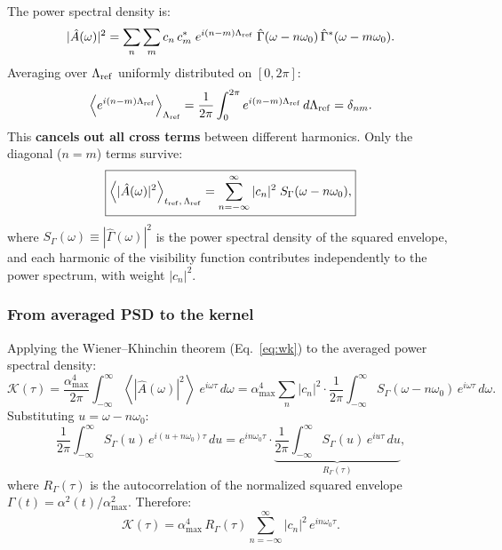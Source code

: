 \documentclass[preprint]{aastex702}
\newcommand{\FT}[1]{\hat{#1}}
\begin{document}
The power spectral density is:
\begin{equation}
    |\FT{A}(\omega)|^2 = \sum_n \sum_m c_n\, c_m^*\; e^{i(n-m)\Lambda_{\rm ref}}\; \FT{\Gamma}(\omega - n\omega_0)\, \FT{\Gamma}^*(\omega - m\omega_0).
    \label{eq:esd_double_sum}
\end{equation}
Averaging over $\Lambda_{\rm ref}$ uniformly distributed on $[0, 2\pi]$:
\begin{equation}
    \left\langle e^{i(n-m)\Lambda_{\rm ref}} \right\rangle_{\Lambda_{\rm ref}}
    = \frac{1}{2\pi}\int_0^{2\pi} e^{i(n-m)\Lambda_{\rm ref}}\, d\Lambda_{\rm ref}
    = \delta_{nm}.
    \label{eq:longitude_orthogonality}
\end{equation}
This \textbf{cancels out all cross terms} between different harmonics. Only the diagonal ($n = m$) terms survive:
\begin{equation}
    \boxed{
    \left\langle |\FT{A}(\omega)|^2 \right\rangle_{t_{\rm ref},\, \Lambda_{\rm ref}}
    = \sum_{n=-\infty}^{\infty} |c_n|^2\; S_\Gamma(\omega - n\omega_0),
    }
    \label{eq:esd_averaged}
\end{equation}
where $S_\Gamma(\omega) \equiv |\FT{\Gamma}(\omega)|^2$ is the power spectral density of the squared envelope, and each harmonic of the visibility function contributes independently to the power spectrum, with weight $|c_n|^2$. 

\subsubsection{From averaged PSD to the kernel}

Applying the Wiener--Khinchin theorem (Eq.~\ref{eq:wk}) to the averaged power spectral density:
\begin{equation}
    \mathcal{K}(\tau) = \frac{\alpha_{\max}^4}{2\pi}\int_{-\infty}^{\infty} \left\langle |\FT{A}(\omega)|^2 \right\rangle\; e^{i\omega\tau}\, d\omega
    = \alpha_{\max}^4 \sum_n |c_n|^2 \cdot \frac{1}{2\pi}\int_{-\infty}^{\infty} S_\Gamma(\omega - n\omega_0)\, e^{i\omega\tau}\, d\omega.
\end{equation}
Substituting $u = \omega - n\omega_0$:
\begin{equation}
    \frac{1}{2\pi}\int_{-\infty}^{\infty} S_\Gamma(u)\, e^{i(u + n\omega_0)\tau}\, du
    = e^{in\omega_0\tau} \cdot \underbrace{\frac{1}{2\pi}\int_{-\infty}^{\infty} S_\Gamma(u)\, e^{iu\tau}\, du}_{R_\Gamma(\tau)},
\end{equation}
where $R_\Gamma(\tau)$ is the autocorrelation of the normalized squared envelope $\Gamma(t) = \alpha^2(t)/\alpha_{\max}^2$. Therefore:
\begin{equation}
    \mathcal{K}(\tau) = \alpha_{\max}^4\, R_\Gamma(\tau) \sum_{n=-\infty}^{\infty} |c_n|^2\, e^{in\omega_0\tau}.
    \label{eq:kernel_complex}
\end{equation}
\end{document}
